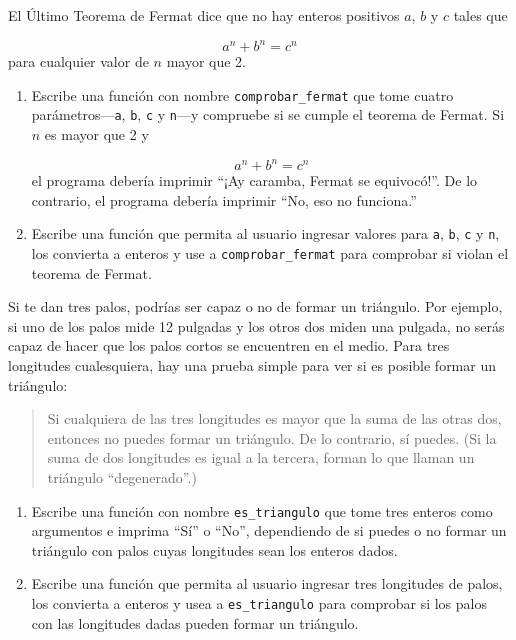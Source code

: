 \documentclass[10pt]{book}
\begin{document}
\begin{exercise}

El Último Teorema de Fermat dice que no hay enteros positivos
$a$, $b$ y $c$ tales que

\[ a^n + b^n = c^n \]
%
para cualquier valor de $n$ mayor que 2.

\begin{enumerate}

\item Escribe una función con nombre \verb"comprobar_fermat" que tome cuatro
parámetros---{\tt a}, {\tt b}, {\tt c} y {\tt n}---y
compruebe si se cumple el teorema de Fermat.  Si
$n$ es mayor que 2 y

\[a^n + b^n = c^n \]
%
el programa debería imprimir ``¡Ay caramba, Fermat se equivocó!''.
De lo contrario, el programa debería imprimir ``No, eso no funciona.''

\item Escribe una función que permita al usuario ingresar valores
para {\tt a}, {\tt b}, {\tt c} y {\tt n}, los convierta a
enteros y use a \verb"comprobar_fermat" para comprobar si
violan el teorema de Fermat.

\end{enumerate}

\end{exercise}


\begin{exercise}

Si te dan tres palos, podrías ser capaz o no de formar
un triángulo.  Por ejemplo, si uno de los palos mide 12 pulgadas
y los otros dos miden una pulgada, no serás
capaz de hacer que los palos cortos se encuentren en el medio.  Para tres
longitudes cualesquiera, hay una prueba simple para ver si es posible formar
un triángulo:

\begin{quotation}
Si cualquiera de las tres longitudes es mayor que la suma de las otras
  dos, entonces no puedes formar un triángulo.  De lo contrario, sí
  puedes.  (Si la suma de dos longitudes es igual a la tercera, forman
    lo que llaman un triángulo ``degenerado''.)
\end{quotation}

\begin{enumerate}

\item Escribe una función con nombre \verb"es_triangulo" que tome tres
  enteros como argumentos e imprima ``Sí'' o ``No'', dependiendo
  de si puedes o no formar un triángulo con palos cuyas longitudes sean
  los enteros dados.

\item Escribe una función que permita al usuario ingresar tres longitudes de
  palos, los convierta a enteros y usea a \verb"es_triangulo" para
  comprobar si los palos con las longitudes dadas pueden formar un triángulo.

\end{enumerate}

\end{exercise}
\end{document}
